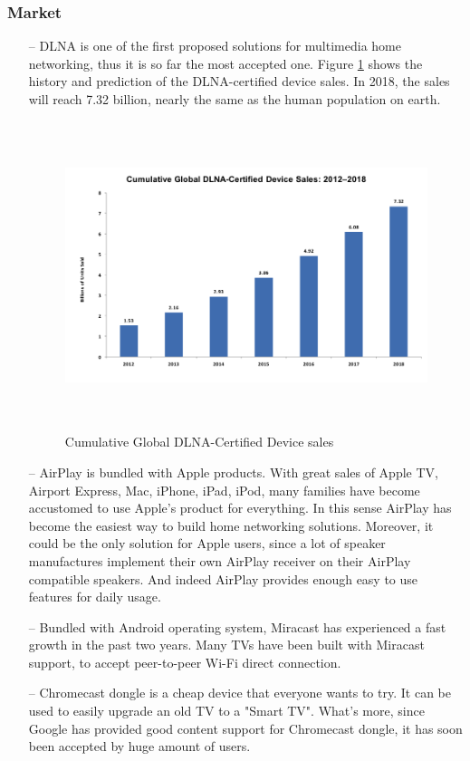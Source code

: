 \subsubsection{Market} 
\begin{itemize} 
\item[--]DLNA is one of the first proposed solutions for multimedia home 
networking, thus it is so far the most accepted one. Figure 
\ref{dlna_market} shows the history and prediction of the DLNA-certified device sales. In 2018, the 
sales will reach 7.32 billion, nearly the same as the human population on earth. 

\begin{figure}[htb] 
\centering \includegraphics[height=9cm]{charts/dlna_market} 
\caption{Cumulative Global DLNA-Certified Device sales \label{dlna_market}} 
\end{figure} 

\item[--]AirPlay is bundled with Apple products. With great sales of Apple TV, Airport Express, 
Mac, iPhone, iPad, iPod, many families have become accustomed to use Apple's product for everything. In this sense AirPlay has become the easiest way to build home networking solutions. Moreover, it could be the only solution for Apple users, since a lot of speaker manufactures implement their own AirPlay receiver on their AirPlay compatible speakers. And indeed AirPlay provides enough easy to use features for daily usage. 
\item[--]Bundled with Android operating system, Miracast has experienced a fast growth in 
the past two years. Many TVs have been built with Miracast support, to accept peer-to-peer Wi-Fi direct connection. 
\item[--]Chromecast dongle is a cheap device that everyone wants to try. It can be used to easily upgrade an old TV to a "Smart TV".  What's more, since Google has provided good content support for Chromecast dongle, it has soon been accepted by huge amount of users. 
\end{itemize} 

